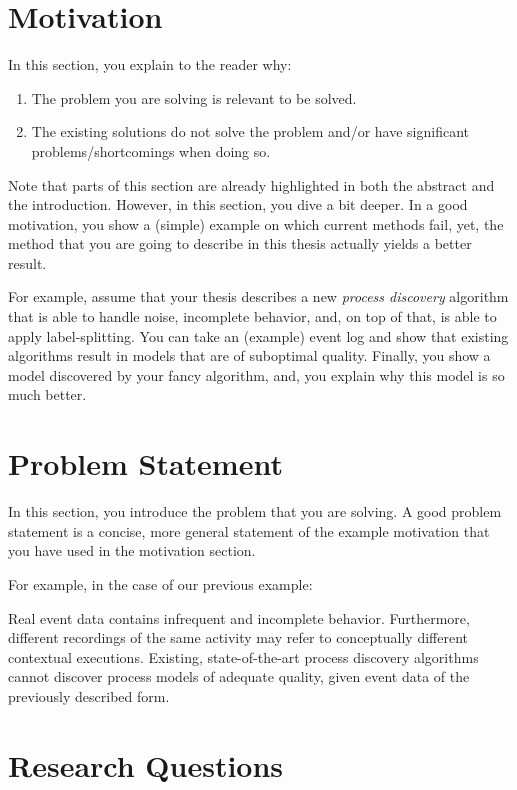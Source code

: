 \section{Motivation}
\label{sec:intro_ssec:motiv}

In this section, you explain to the reader why:
\begin{enumerate}
	\item The problem you are solving is relevant to be solved.
	\item The existing solutions do not solve the problem and/or have significant problems/shortcomings when doing so.
\end{enumerate}
Note that parts of this section are already highlighted in both the abstract and the introduction.
However, in this section, you dive a bit deeper.
In a good motivation, you show a (simple) example on which current methods fail, yet, the method that you are going to describe in this thesis actually yields a better result.

For example, assume that your thesis describes a new \emph{process discovery} algorithm that is able to handle noise, incomplete behavior, and, on top of that, is able to apply label-splitting.
You can take an (example) event log and show that existing algorithms result in models that are of suboptimal quality.
Finally, you show a model discovered by your fancy algorithm, and, you explain why this model is so much better.

\section{Problem Statement}
\label{sec:intro_ssec:probs}

In this section, you introduce the problem that you are solving.
A good problem statement is a concise, more general statement of the example motivation that you have used in the motivation section.

For example, in the case of our previous example:

\begin{displayquote}
	Real event data contains infrequent and incomplete behavior.
	Furthermore, different recordings of the same activity may refer to conceptually different contextual executions.
	Existing, state-of-the-art process discovery algorithms cannot discover process models of adequate quality, given event data of the previously described form.
\end{displayquote}

\section{Research Questions}

